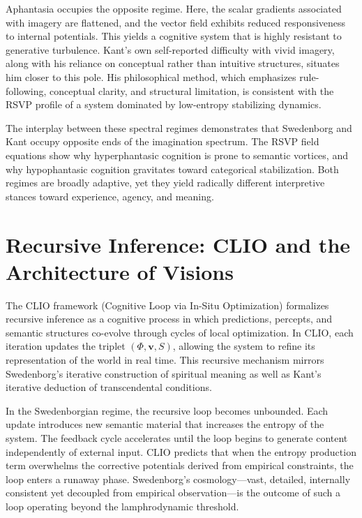 \documentclass[12pt]{article}
\begin{document}
Aphantasia occupies the opposite regime. Here, the scalar gradients 
associated with imagery are flattened, and the vector field exhibits reduced 
responsiveness to internal potentials. This yields a cognitive system that is 
highly resistant to generative turbulence. Kant's own self-reported difficulty 
with vivid imagery, along with his reliance on conceptual rather than 
intuitive structures, situates him closer to this pole. His philosophical 
method, which emphasizes rule-following, conceptual clarity, and structural 
limitation, is consistent with the RSVP profile of a system dominated by 
low-entropy stabilizing dynamics.

The interplay between these spectral regimes demonstrates that Swedenborg and 
Kant occupy opposite ends of the imagination spectrum. The RSVP field 
equations show why hyperphantasic cognition is prone to semantic vortices, 
and why hypophantasic cognition gravitates toward categorical stabilization. 
Both regimes are broadly adaptive, yet they yield radically different 
interpretive stances toward experience, agency, and meaning.

\section{Recursive Inference: CLIO and the Architecture of Visions}

The CLIO framework (Cognitive Loop via In-Situ Optimization) formalizes 
recursive inference as a cognitive process in which predictions, percepts, and 
semantic structures co-evolve through cycles of local optimization. In CLIO, 
each iteration updates the triplet $(\Phi, \mathbf{v}, S)$, allowing the 
system to refine its representation of the world in real time. This recursive 
mechanism mirrors Swedenborg’s iterative construction of spiritual meaning as 
well as Kant’s iterative deduction of transcendental conditions.

In the Swedenborgian regime, the recursive loop becomes unbounded. Each update 
introduces new semantic material that increases the entropy of the system. The 
feedback cycle accelerates until the loop begins to generate content 
independently of external input. CLIO predicts that when the entropy 
production term overwhelms the corrective potentials derived from empirical 
constraints, the loop enters a runaway phase. Swedenborg’s cosmology—vast, 
detailed, internally consistent yet decoupled from empirical observation—is 
the outcome of such a loop operating beyond the lamphrodynamic threshold.
\end{document}
